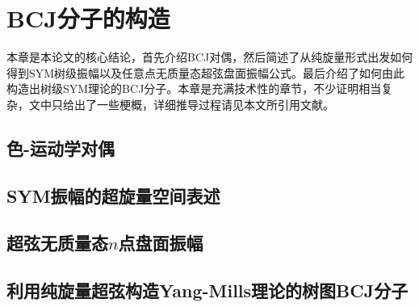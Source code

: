 \chapter{BCJ分子的构造}
本章是本论文的核心结论，首先介绍BCJ对偶，然后简述了从纯旋量形式出发如何得到SYM树级振幅以及任意点无质量态超弦盘面振幅公式。最后介绍了如何由此构造出树级SYM理论的BCJ分子。本章是充满技术性的章节，不少证明相当复杂，文中只给出了一些梗概，详细推导过程请见本文所引用文献。
\section{色-运动学对偶}

\section{SYM振幅的超旋量空间表述}

\section{超弦无质量态$n$点盘面振幅}

\section{利用纯旋量超弦构造Yang-Mills理论的树图BCJ分子}